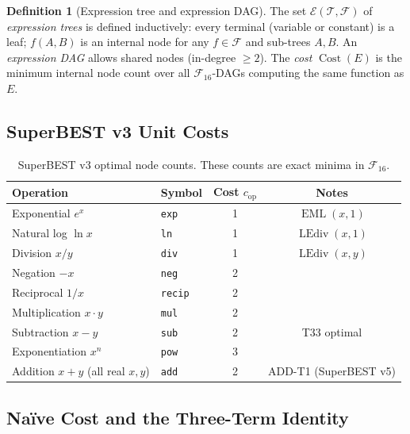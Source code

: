 \documentclass[12pt,a4paper]{article}
\theoremstyle{definition}
\newtheorem{definition}[theorem]{Definition}
\newcommand{\EML}{\operatorname{EML}}
\newcommand{\LEdiv}{\operatorname{LEdiv}}
\newcommand{\Cost}{\operatorname{Cost}}
\newcommand{\Fam}{\mathcal{F}}
\begin{document}
\begin{definition}[Expression tree and expression DAG]
\label{def:tree}
The set $\mathcal{E}(\mathcal{T},\Fam)$ of \emph{expression trees} is defined
inductively: every terminal (variable or constant) is a leaf; $f(A,B)$ is an
internal node for any $f \in \Fam$ and sub-trees $A, B$.  An
\emph{expression DAG} allows shared nodes (in-degree $\geq 2$).  The
\emph{cost} $\Cost(E)$ is the minimum internal node count over all
$\mathcal{F}_{16}$-DAGs computing the same function as $E$.
\end{definition}

\subsection{SuperBEST v3 Unit Costs}

\begin{table}[h]
\centering
\caption{SuperBEST v3 optimal node counts.  These counts are exact minima in
         $\mathcal{F}_{16}$.}
\label{tab:unitcosts}
\smallskip
\begin{tabular}{@{}llcc@{}}
\toprule
\textbf{Operation} & \textbf{Symbol} &
  \textbf{Cost $c_{\mathrm{op}}$} & \textbf{Notes} \\
\midrule
Exponential $e^x$            & \texttt{exp}   & 1  & $\EML(x,1)$ \\
Natural log $\ln x$          & \texttt{ln}    & 1  & $\LEdiv(x,1)$ \\
Division $x/y$               & \texttt{div}   & 1  & $\LEdiv(x,y)$ \\
Negation $-x$                & \texttt{neg}   & 2  & \\
Reciprocal $1/x$             & \texttt{recip} & 2  & \\
Multiplication $x\cdot y$    & \texttt{mul}   & 2  & \\
Subtraction $x-y$            & \texttt{sub}   & 2  & T33 optimal \\
Exponentiation $x^n$         & \texttt{pow}   & 3  & \\
Addition $x+y$ (all real $x,y$) & \texttt{add} & 2  & ADD-T1 (SuperBEST v5) \\
\bottomrule
\end{tabular}
\end{table}

\subsection{Na\"{i}ve Cost and the Three-Term Identity}
\end{document}
